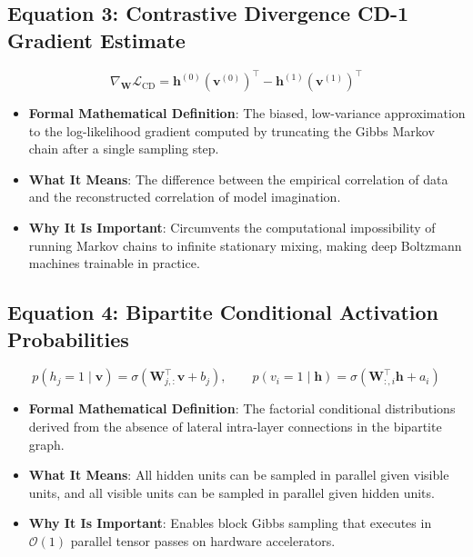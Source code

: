 \documentclass[11pt,a4paper]{article}
\theoremstyle{definition}
\begin{document}
\subsection{\textbf{Equation 3: Contrastive Divergence CD-1 Gradient Estimate}}
{\boldmath
\begin{equation}
\nabla_{\mathbf{W}} \mathcal{L}_{\text{CD}} = \mathbf{h}^{(0)} (\mathbf{v}^{(0)})^\top - \mathbf{h}^{(1)} (\mathbf{v}^{(1)})^\top
\end{equation}
}
\begin{itemize}
    \item \textbf{Formal Mathematical Definition}:
    The biased, low-variance approximation to the log-likelihood gradient computed by truncating the Gibbs Markov chain after a single sampling step.
    \item \textbf{What It Means}:
    The difference between the empirical correlation of data and the reconstructed correlation of model imagination.
    \item \textbf{Why It Is Important}:
    Circumvents the computational impossibility of running Markov chains to infinite stationary mixing, making deep Boltzmann machines trainable in practice.
\end{itemize}

\subsection{\textbf{Equation 4: Bipartite Conditional Activation Probabilities}}
{\boldmath
\begin{equation}
p(h_j = 1 \mid \mathbf{v}) = \sigma(\mathbf{W}_{j, :}^\top \mathbf{v} + b_j), \qquad p(v_i = 1 \mid \mathbf{h}) = \sigma(\mathbf{W}_{:, i}^\top \mathbf{h} + a_i)
\end{equation}
}
\begin{itemize}
    \item \textbf{Formal Mathematical Definition}:
    The factorial conditional distributions derived from the absence of lateral intra-layer connections in the bipartite graph.
    \item \textbf{What It Means}:
    All hidden units can be sampled in parallel given visible units, and all visible units can be sampled in parallel given hidden units.
    \item \textbf{Why It Is Important}:
    Enables block Gibbs sampling that executes in $\mathcal{O}(1)$ parallel tensor passes on hardware accelerators.
\end{itemize}
\end{document}
